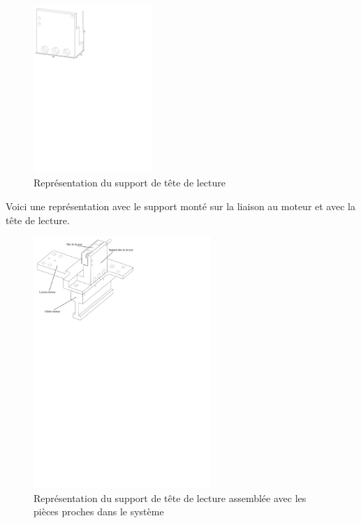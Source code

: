 \begin{figure}[H]
  \centering
  \includegraphics[width = 0.4\textwidth]{assets/figures/SupportTeteLecture.svg}
  \caption{Représentation du support de tête de lecture}
  \label{fig:SupTeteLect}
\end{figure}

Voici une représentation avec le support monté sur la liaison au moteur et avec la tête de lecture.

\begin{figure}[H]
  \centering
  \includegraphics[width = 0.6\textwidth]{assets/figures/AssemblageMesureLineaire.svg}
  \caption{Représentation du support de tête de lecture assemblée avec les pièces proches dans le système}
  \label{fig:AssMesLin}
\end{figure}

